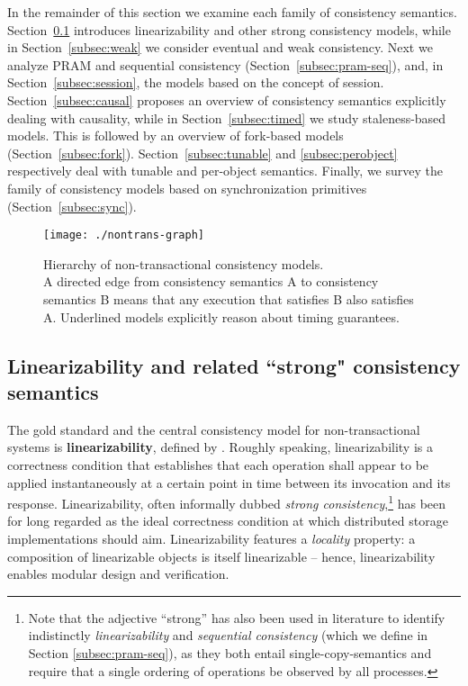 \documentclass[letter, 11pt]{article}
\newcommand{\citeN}{\citet}
\newcommand{\A}{\ensuremath{A}}
\begin{document}
In the remainder of this section we examine each family of consistency semantics.
Section~\ref{subsec:lin} introduces linearizability and other strong consistency models, while in Section~\ref{subsec:weak} we consider eventual and weak consistency.
Next we analyze PRAM and sequential consistency (Section~\ref{subsec:pram-seq}), and, in Section~\ref{subsec:session}, the models based on the concept of session.
Section~\ref{subsec:causal} proposes an overview of consistency semantics explicitly dealing with causality,
while in Section~\ref{subsec:timed} we study staleness-based models. This is followed by an overview of fork-based models (Section~\ref{subsec:fork}).
Section~\ref{subsec:tunable} and \ref{subsec:perobject} respectively deal with tunable and per-object semantics.
Finally, we survey the family of consistency models based on synchronization primitives (Section~\ref{subsec:sync}).
\begin{figure}[!htp]
	\centering
	\texttt{[image: ./nontrans-graph]} 	\caption{\footnotesize Hierarchy of non-transactional consistency models. \\A directed edge from  consistency semantics A to consistency semantics B means that any execution that satisfies B also satisfies A.
	Underlined models explicitly reason about timing guarantees.}
	\label{fig:non-trans_graph}
\end{figure}


\subsection{Linearizability and related ``strong" consistency semantics}
\label{subsec:lin}
The gold standard and the central consistency model for non-transactional systems is \textbf{linearizability}, defined by \citeN{Herlihy.Wing:90}. Roughly speaking, linearizability is a correctness condition that 
establishes that each operation shall appear to be applied instantaneously 
at a certain point in time between its invocation and its response.
Linearizability, often informally dubbed \emph{strong consistency},\footnote{Note that the adjective ``strong'' 
	has also been used in literature to identify indistinctly 
	\emph{linearizability} and \emph{sequential consistency} 
	(which we define in Section \ref{subsec:pram-seq}), 
	as they both entail single-copy-semantics 
	and require that a single ordering of operations be observed by all processes.}
has been for long regarded as the ideal 
correctness condition at which distributed storage implementations should aim.
Linearizability features a
\emph{locality} property: a composition of linearizable objects is itself linearizable -- hence, linearizability enables modular design and verification. 
\end{document}
